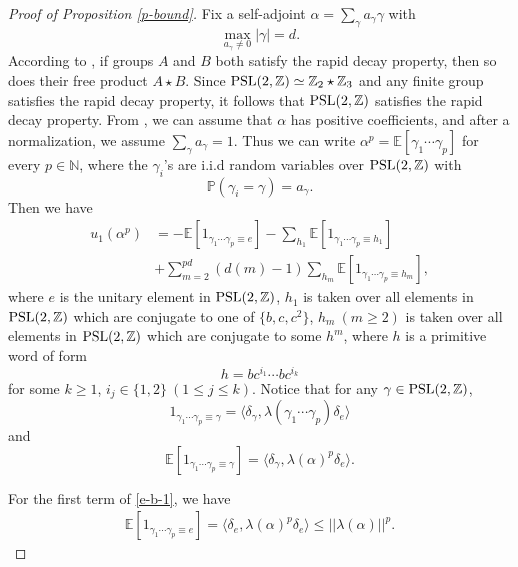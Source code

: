 \documentclass{amsart}
\theoremstyle{plain}
\theoremstyle{definition}
\theoremstyle{remark}
\begin{document}
    \begin{proof}[Proof of Proposition \ref{p-bound}]
        Fix a self-adjoint $\alpha=\sum\limits_{\gamma}a_{\gamma}\gamma$ with $$\max\limits_{a_{\gamma}\neq 0}|\gamma|=d.$$ 
        According to \cite[Theorem A]{Jo90}, if groups $A$ and $B$ both satisfy the rapid decay property, then so does their free product $A\star B$.
        Since $\textnormal{PSL}(2,\mathbb{Z})\simeq \mathbb{Z}_2\star\mathbb{Z}_3$ and any finite group satisfies the rapid decay property, it follows that $\textnormal{PSL}(2,\mathbb{Z})$ satisfies the rapid decay property. From \cite[Proposition 6.3]{MdlS24}, we can assume that $\alpha$ has positive coefficients, and after a normalization, we assume $\sum\limits_{\gamma}a_{\gamma}=1$. Thus we can write $\alpha^p=\mathbb{E}[\gamma_1\cdots\gamma_p]$ for every $p\in\mathbb{N}$, where the $\gamma_i$'s are i.i.d random variables over $\textnormal{PSL}(2,\mathbb{Z})$ with $$\mathbb{P}\left(\gamma_i=\gamma\right)=a_\gamma.$$
        Then we have
        \begin{equation}\label{e-b-1}
        \begin{aligned}
        u_1(\alpha^p)&=-\mathbb{E}\left[1_{\gamma_1\cdots\gamma_p\equiv e}\right]-\sum\limits_{h_1}\mathbb{E}\left[1_{\gamma_1\cdots\gamma_p\equiv h_1}\right]\\
        &+\sum\limits_{m=2}^{pd}(d(m)-1)\sum\limits_{h_m}\mathbb{E}\left[1_{\gamma_1\cdots\gamma_p\equiv h_m}\right],
        \end{aligned}
        \end{equation}
        where $e$ is the unitary element in $\textnormal{PSL}(2,\mathbb{Z})$, $h_1$ is taken over all elements in $\textnormal{PSL}(2,\mathbb{Z})$ which are conjugate to one of $\{b,c,c^2\}$, $h_m\ (m\geq 2)$ is taken over all elements in $\textnormal{PSL}(2,\mathbb{Z})$ which are conjugate to some $h^m$, where $h$ is a primitive word of form $$h=bc^{i_1}\cdots bc^{i_k}$$
        for some $k\geq 1$, $i_j\in\{1,2\}\ (1\leq j\leq k)$. Notice that for any $\gamma\in\textnormal{PSL}(2,\mathbb{Z})$,
        $$1_{\gamma_1\cdots\gamma_p\equiv \gamma}=\langle\delta_\gamma,\lambda(\gamma_1\cdots\gamma_p)\delta_e\rangle$$
        and
        $$\mathbb{E}\left[1_{\gamma_1\cdots\gamma_p\equiv \gamma}\right]=\langle\delta_\gamma,\lambda(\alpha)^p\delta_e\rangle.$$
        
        For the first term of \eqref{e-b-1}, we have
        \begin{align}\label{e-b-4}
           \mathbb{E}\left[1_{\gamma_1\cdots\gamma_p\equiv e}\right]=\langle \delta_e,\lambda(\alpha)^p\delta_e\rangle \leq ||\lambda(\alpha)||^p.
        \end{align}


\end{proof}
\end{document}
